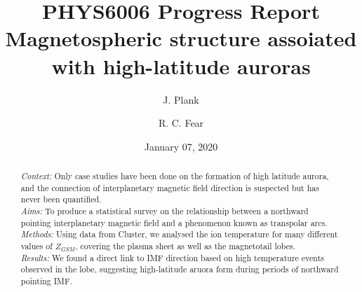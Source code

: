 \documentclass{article}
\title{PHYS6006 Progress Report \\
       Magnetospheric structure assoiated with high-latitude auroras}
\author[1]{J. Plank}
\author[2]{R. C. Fear}
\affil[1, 2]{Department of Physics and Astronomy, University of Southampton}
\date{January 07, 2020}
\begin{document}
\maketitle

\begin{abstract}
    \noindent\textit{Context:} Only case studies have been done on the formation of high latitude aurora, and the connection of interplanetary magnetic field direction is suspected but has never been quantified.\\
    \textit{Aims:} To produce a statistical survey on the relationship between a northward pointing interplanetary magnetic field and a phenomenon known as transpolar arcs.\\
    \textit{Methods:} Using data from Cluster, we analysed the ion temperature for many different values of $Z_{GSM}$, covering the plasma sheet as well as the magnetotail lobes.\\
    \textit{Results:} We found a direct link to IMF direction based on high temperature events observed in the lobe, suggesting high-latitude aruora form during periods of northward pointing IMF.
\end{abstract}
\end{document}
